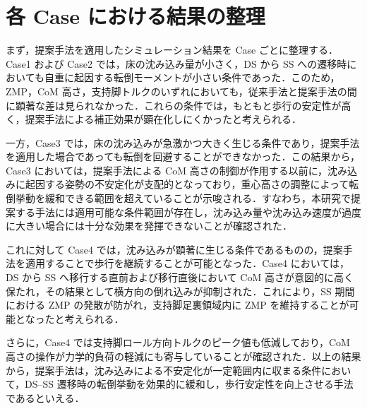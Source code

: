 \section{各 Case における結果の整理}
\label{sec:discussion_summary}

まず，提案手法を適用したシミュレーション結果を Case ごとに整理する．Case1 および Case2 では，床の沈み込み量が小さく，DS から SS への遷移時においても自重に起因する転倒モーメントが小さい条件であった．このため，ZMP，CoM 高さ，支持脚トルクのいずれにおいても，従来手法と提案手法の間に顕著な差は見られなかった．これらの条件では，もともと歩行の安定性が高く，提案手法による補正効果が顕在化しにくかったと考えられる．

一方，Case3 では，床の沈み込みが急激かつ大きく生じる条件であり，提案手法を適用した場合であっても転倒を回避することができなかった．この結果から，Case3 においては，提案手法による CoM 高さの制御が作用する以前に，沈み込みに起因する姿勢の不安定化が支配的となっており，重心高さの調整によって転倒挙動を緩和できる範囲を超えていることが示唆される．すなわち，本研究で提案する手法には適用可能な条件範囲が存在し，沈み込み量や沈み込み速度が過度に大きい場合には十分な効果を発揮できないことが確認された．

これに対して Case4 では，沈み込みが顕著に生じる条件であるものの，提案手法を適用することで歩行を継続することが可能となった．Case4 においては，DS から SS へ移行する直前および移行直後において CoM 高さが意図的に高く保たれ，その結果として横方向の倒れ込みが抑制された．これにより，SS 期間における ZMP の発散が防がれ，支持脚足裏領域内に ZMP を維持することが可能となったと考えられる．

さらに，Case4 では支持脚ロール方向トルクのピーク値も低減しており，CoM 高さの操作が力学的負荷の軽減にも寄与していることが確認された．以上の結果から，提案手法は，沈み込みによる不安定化が一定範囲内に収まる条件において，DS--SS 遷移時の転倒挙動を効果的に緩和し，歩行安定性を向上させる手法であるといえる．
